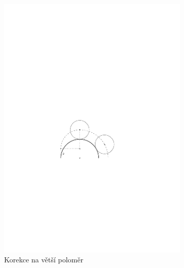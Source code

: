 			\begin{figure}[h!]
				\centering
					\begin{subfigure}[b]{0.40\textwidth}
						\centering
						\includegraphics[width=\textwidth]{img/korekce-leadin4.pdf}
						\caption{Korekce na větší poloměr}
					\end{subfigure}
					~~~
					\begin{subfigure}[b]{0.40\textwidth}
						\centering

\end{subfigure}
\end{figure}
